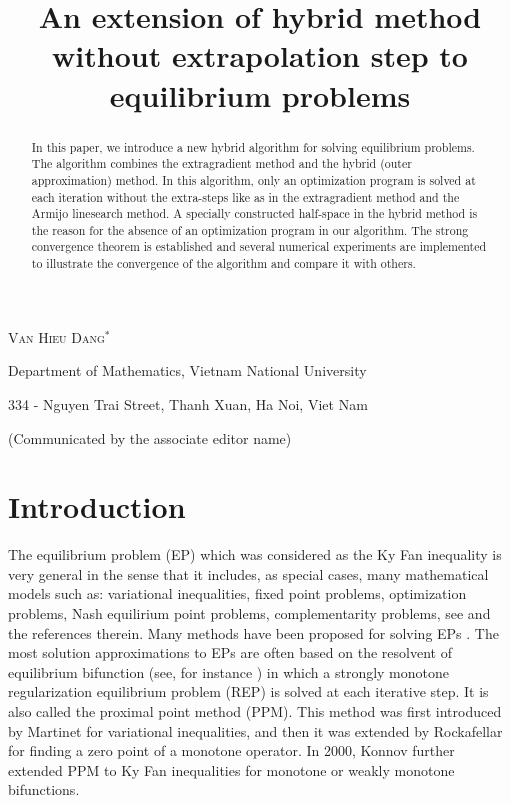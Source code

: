 \documentclass{aims}
\title[An extension of hybrid method without extrapolation step to EPs] 
      {An extension of hybrid method without extrapolation step to equilibrium problems}
\author[Van Hieu Dang]{}
\theoremstyle{definition}
\begin{document}
\maketitle

\centerline{\scshape Van Hieu Dang$^*$}
\medskip
{\footnotesize
 \centerline{Department of Mathematics, Vietnam National University}
   \centerline{334 - Nguyen Trai Street, Thanh Xuan, Ha Noi, Viet Nam}
  
} 

\medskip
\bigskip

 \centerline{(Communicated by the associate editor name)}

\begin{abstract}
In this paper, we introduce a new hybrid algorithm for solving equilibrium problems. The algorithm combines the extragradient method and the 
hybrid (outer approximation) method.
In this algorithm, only an optimization program is solved at each iteration without the extra-steps like as in the extragradient method and the 
Armijo linesearch method. A specially constructed half-space in the hybrid method is the reason for the absence of an 
optimization program in our algorithm. The strong convergence theorem is established and several numerical experiments are implemented to illustrate 
the convergence of the algorithm and compare it with others.
\end{abstract}

\section{Introduction}\label{intro}
The equilibrium problem (EP) \cite{BO1994} which was considered as the Ky Fan inequality \cite{KF1972} is very general in the sense that it includes, as special cases, many mathematical 
models such as: variational inequalities, fixed point problems, optimization problems, Nash equilirium point problems, complementarity problems, see 
\cite{BO1994,MO1992} and the references therein. Many methods have been proposed for solving EPs 
\cite{AH2014b,BO1994,CH2005,DHM2014,H2015,M2000,MO1992,QMH2008,TT2007,JK2010}. 
The most solution approximations to EPs are often based on the resolvent of equilibrium bifunction (see, for instance \cite{CH2005}) in which 
a strongly monotone regularization equilibrium problem (REP) is solved at each iterative step. It is also called the proximal point method (PPM). This method was first introduced by 
Martinet \cite{M1970} for variational inequalities, and then it was extended by Rockafellar \cite{R1976} for finding a zero point of a monotone operator. In 2000, 
Konnov \cite{K2000} further extended PPM to Ky Fan inequalities for monotone or weakly monotone bifunctions.
\end{document}
